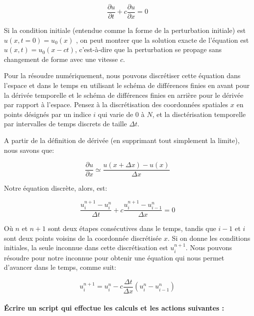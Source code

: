 \documentclass{article}
\begin{document}
\[ \frac{\partial u}{\partial t} + c \frac{ \partial u}{\partial x} = 0\]

Si la condition initiale (entendue comme la forme de la perturbation
initiale) est \(u(x, t=0) = u_0 (x)\) , on peut montrer que la solution
exacte de l'équation est \(u (x, t) = u_0 (x-ct)\), c'est-à-dire que la
perturbation se propage sans changement de forme avec une vitesse \(c\).

Pour la résoudre numériquement, nous pouvons discrétiser cette équation
dans l'espace et dans le temps en utilisant le schéma de différences
finies en avant pour la dérivée temporelle et le schéma de différences
finies en arrière pour le dérivée par rapport à l'espace. Pensez à la
discrétisation des coordonnées spatiales \(x\) en points désignés par un
indice \(i\) qui varie de \(0\) à \(N\), et la disctérisation temporelle
par intervalles de temps discrets de taille \(\Delta t\).

A partir de la définition de dérivée (en supprimant tout simplement la
limite), nous savons que:

\[\frac{\partial u}{\partial x} \simeq \frac{u(x+\Delta x) - u(x)}{\Delta x} \]

Notre équation discrète, alors, est:

\[\frac{u_i^{n+1} - u_i^{n}}{\Delta t} + c \frac{u_i^{n+1} - u_{i-1}^{n}}{\Delta x} = 0\]

Où \(n\) et \(n + 1\) sont deux étapes consécutives dans le temps,
tandis que \(i-1\) et \(i\) sont deux points voisins de la coordonnée
discrétisée \(x\). Si on donne les conditions initiales, la seule
inconnue dans cette discrétisation est \(u_i^{n+1}\). Nous pouvons
résoudre pour notre inconnue pour obtenir une équation qui nous permet
d'avancer dans le temps, comme suit:

\[u_i^{n+1} = u_i^{n} - c \frac{\Delta t}{\Delta x}(u_i^{n} - u_{i-1}^n)\]


    \paragraph{Écrire un script qui effectue les calculs et les actions suivantes :}
\end{document}
